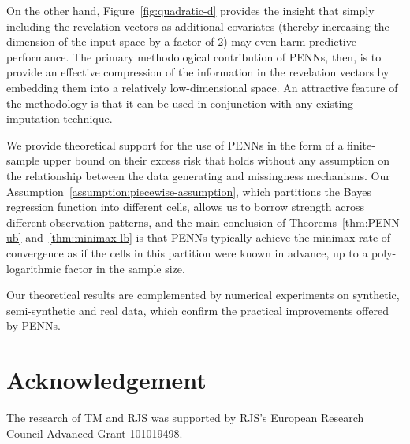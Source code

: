 \documentclass[12pt]{article}
\begin{document}
On the other hand, Figure~\ref{fig:quadratic-d} provides the insight that simply including the revelation vectors as additional covariates (thereby increasing the dimension of the input space by a factor of 2) may even harm predictive performance.  The primary methodological contribution of PENNs, then, is to provide an effective compression of the information in the revelation vectors by embedding them into a relatively low-dimensional space.  An attractive feature of the methodology is that it can be used in conjunction with any existing imputation technique.

We provide theoretical support for the use of PENNs in the form of a finite-sample upper bound on their excess risk that holds without any assumption on the relationship between the data generating and missingness mechanisms.  Our Assumption~\ref{assumption:piecewise-assumption}, which partitions the Bayes regression function into different cells, allows us to borrow strength across different observation patterns, and the main conclusion of Theorems~\ref{thm:PENN-ub} and~\ref{thm:minimax-lb} is that PENNs typically achieve the minimax rate of convergence as if the cells in this partition were known in advance, up to a poly-logarithmic factor in the sample size.

Our theoretical results are complemented by numerical experiments on synthetic, semi-synthetic and real data, which confirm the practical improvements offered by PENNs.


\section*{Acknowledgement}
The research of TM and RJS was supported by RJS's European Research Council Advanced Grant 101019498.




	


\appendix
\end{document}
